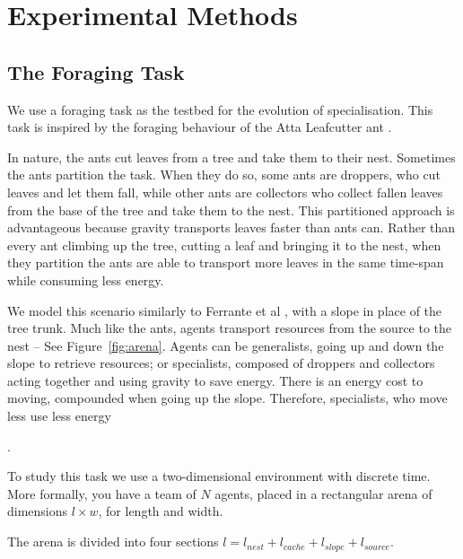 \documentclass[12pt]{article}  %
\begin{document}
\section{Experimental Methods}

\subsection{The Foraging Task}

We use a foraging task as the testbed for the evolution of specialisation.
This task is inspired by the foraging behaviour of the Atta Leafcutter ant \cite{pini:Swarm_Intelligence:2011, pini:ICSI:2012, ferrante:PLOS_CB:2015}.


In nature, the ants cut leaves from a tree and take them to their nest. 
Sometimes the ants partition the task. 
When they do so, some ants are droppers, who cut leaves and let them fall, while other ants are collectors who collect fallen leaves from the base of the tree and take them to the nest.
This partitioned approach is advantageous because gravity transports leaves faster than ants can.
Rather than every ant climbing up the tree, cutting a leaf and bringing it to the nest, when they partition the ants are able to transport more leaves in the same time-span while consuming less energy.





We model this scenario similarly to Ferrante et al \cite{ferrante:PLOS_CB:2015}, with a slope in place of the tree trunk.
Much like the ants, agents transport resources from the source to the nest -- See Figure~\ref{fig:arena}.
Agents can be generalists, going up and down the slope to retrieve resources; or specialists, composed of droppers and collectors acting together and using gravity to save energy.
There is an energy cost to moving, compounded when going up the slope. 
Therefore, specialists, who move less use less energy

. 

To study this task we use a two-dimensional environment with discrete time.  
More formally, you have a team of $N$ agents, placed in a rectangular arena of dimensions $l \times w$, for length and width. 




The arena is divided into four sections $l= l_{nest} + l_{cache} + l_{slope} + l_{source}$.
\end{document}
